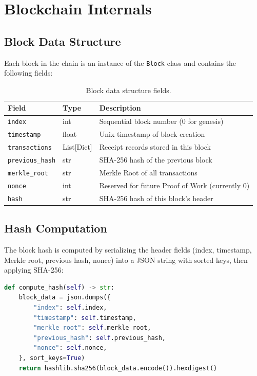 \documentclass[12pt, a4paper]{report}
\begin{document}
\chapter{Blockchain Internals}

\section{Block Data Structure}

Each block in the chain is an instance of the \texttt{Block} class and contains
the following fields:

\begin{table}[H]
\centering
\begin{tabularx}{\textwidth}{l l X}
\toprule
\textbf{Field} & \textbf{Type} & \textbf{Description} \\
\midrule
\texttt{index} & int & Sequential block number (0 for genesis) \\
\texttt{timestamp} & float & Unix timestamp of block creation \\
\texttt{transactions} & List[Dict] & Receipt records stored in this block \\
\texttt{previous\_hash} & str & SHA-256 hash of the previous block \\
\texttt{merkle\_root} & str & Merkle Root of all transactions \\
\texttt{nonce} & int & Reserved for future Proof of Work (currently 0) \\
\texttt{hash} & str & SHA-256 hash of this block's header \\
\bottomrule
\end{tabularx}
\caption{Block data structure fields.}
\end{table}

\section{Hash Computation}

The block hash is computed by serializing the header fields (index, timestamp,
Merkle root, previous hash, nonce) into a JSON string with sorted keys, then
applying SHA-256:

\begin{lstlisting}[language=Python, caption={Block hash computation.}]
def compute_hash(self) -> str:
    block_data = json.dumps({
        "index": self.index,
        "timestamp": self.timestamp,
        "merkle_root": self.merkle_root,
        "previous_hash": self.previous_hash,
        "nonce": self.nonce,
    }, sort_keys=True)
    return hashlib.sha256(block_data.encode()).hexdigest()
\end{lstlisting}
\end{document}
